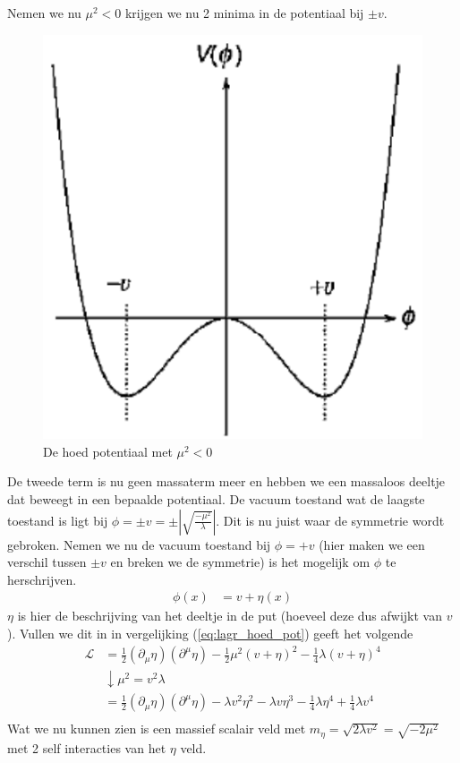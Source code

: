 \documentclass[../main.tex]{subfiles}
\begin{document}
Nemen we nu $\mu^2<0$ krijgen we nu 2 minima in de potentiaal bij $\pm v$.

\begin{figure}[h]
    \centering
    \includegraphics[width=0.2\linewidth]{higgs_boson/hoed_pot_2.png}
    \caption{De hoed potentiaal met $\mu^2<0$}%
    \label{fig:higgs_boson/hoed_pot_2}
\end{figure}

De tweede term is nu geen massaterm meer en hebben we een massaloos deeltje dat beweegt in een bepaalde potentiaal. De vacuum toestand wat de laagste toestand is ligt bij $\phi = \pm v = \pm \left| \sqrt{ \frac{-\mu^2}{\lambda}} \right|$. Dit is nu juist waar de symmetrie wordt gebroken. Nemen we nu de vacuum toestand bij $\phi = +v$ (hier maken we een verschil tussen $\pm v$ en breken we de symmetrie) is het mogelijk om $\phi$ te herschrijven.
\begin{equation}
    \begin{aligned}
        \label{eq:veld_symm_breking}
        \phi(x) &= v+\eta(x)
    \end{aligned}
\end{equation}
$\eta$ is hier de beschrijving van het deeltje in de put (hoeveel deze dus afwijkt van $v$). Vullen we dit in in vergelijking (\ref{eq:lagr_hoed_pot}) geeft het volgende
\begin{equation}
    \begin{aligned}
        \label{eq:lagr_hoed_pot_symm_breking}
        \mathcal{L} &= \frac{1}{2} (\partial_\mu \eta) (\partial^\mu \eta) - \frac{1}{2} \mu^2 (v+\eta)^2 - \frac{1}{4} \lambda (v+\eta)^4\\
                    &\downarrow \mu^2= v^2\lambda\\
        &= \frac{1}{2} (\partial_\mu \eta) (\partial^\mu \eta) - \lambda v^2\eta^2 - \lambda v \eta^3 - \frac{1}{4} \lambda \eta^4 + \frac{1}{4} \lambda v^4\\
    \end{aligned}
\end{equation}
Wat we nu kunnen zien is een massief scalair veld met $m_\eta = \sqrt{2\lambda v^2} = \sqrt{-2\mu^2}$ met 2 self interacties van het $\eta$ veld.
\end{document}
